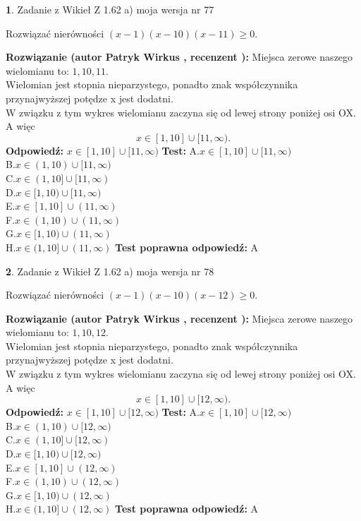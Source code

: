 \documentclass[12pt, a4paper]{article}
\theoremstyle{definition} %
\newtheorem{zad}{}
\newcommand{\zadStart}[1]{\begin{zad}#1\newline}
\newcommand{\zadStop}{\end{zad}}
\newcommand{\rozwStart}[2]{\noindent \textbf{Rozwiązanie (autor #1 , recenzent #2): }\newline}
\newcommand{\rozwStop}{\newline}
\newcommand{\odpStart}{\noindent \textbf{Odpowiedź:}\newline}
\newcommand{\odpStop}{\newline}
\newcommand{\testStart}{\noindent \textbf{Test:}\newline}
\newcommand{\testStop}{\newline}
\newcommand{\kluczStart}{\noindent \textbf{Test poprawna odpowiedź:}\newline}
\newcommand{\kluczStop}{\newline}
\begin{document}
\zadStart{Zadanie z Wikieł Z 1.62 a) moja wersja nr 77}

Rozwiązać nierówności $(x-1)(x-10)(x-11)\ge0$.
\zadStop
\rozwStart{Patryk Wirkus}{}
Miejsca zerowe naszego wielomianu to: $1, 10, 11$.\\
Wielomian jest stopnia nieparzystego, ponadto znak współczynnika przy\linebreak najwyższej potędze x jest dodatni.\\ W związku z tym wykres wielomianu zaczyna się od lewej strony poniżej osi OX. A więc $$x \in [1,10] \cup [11,\infty).$$
\rozwStop
\odpStart
$x \in [1,10] \cup [11,\infty)$
\odpStop
\testStart
A.$x \in [1,10] \cup [11,\infty)$\\
B.$x \in (1,10) \cup [11,\infty)$\\
C.$x \in (1,10] \cup [11,\infty)$\\
D.$x \in [1,10) \cup [11,\infty)$\\
E.$x \in [1,10] \cup (11,\infty)$\\
F.$x \in (1,10) \cup (11,\infty)$\\
G.$x \in [1,10) \cup (11,\infty)$\\
H.$x \in (1,10] \cup (11,\infty)$
\testStop
\kluczStart
A
\kluczStop



\zadStart{Zadanie z Wikieł Z 1.62 a) moja wersja nr 78}

Rozwiązać nierówności $(x-1)(x-10)(x-12)\ge0$.
\zadStop
\rozwStart{Patryk Wirkus}{}
Miejsca zerowe naszego wielomianu to: $1, 10, 12$.\\
Wielomian jest stopnia nieparzystego, ponadto znak współczynnika przy\linebreak najwyższej potędze x jest dodatni.\\ W związku z tym wykres wielomianu zaczyna się od lewej strony poniżej osi OX. A więc $$x \in [1,10] \cup [12,\infty).$$
\rozwStop
\odpStart
$x \in [1,10] \cup [12,\infty)$
\odpStop
\testStart
A.$x \in [1,10] \cup [12,\infty)$\\
B.$x \in (1,10) \cup [12,\infty)$\\
C.$x \in (1,10] \cup [12,\infty)$\\
D.$x \in [1,10) \cup [12,\infty)$\\
E.$x \in [1,10] \cup (12,\infty)$\\
F.$x \in (1,10) \cup (12,\infty)$\\
G.$x \in [1,10) \cup (12,\infty)$\\
H.$x \in (1,10] \cup (12,\infty)$
\testStop
\kluczStart
A
\kluczStop
\end{document}
